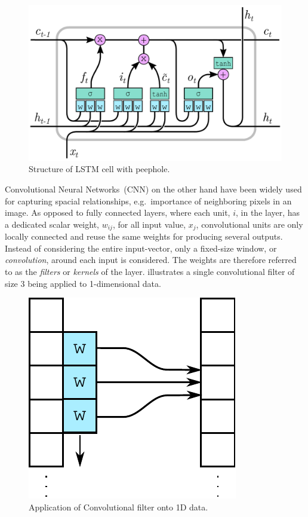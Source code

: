 \documentclass[preprint,11pt,5p,twocolumn]{elsarticle}
\begin{document}
\begin{figure}[!ht]
  \centering
  \includegraphics[scale=.45]{drawings/lstm-peepholes.pdf}
  \caption{Structure of LSTM cell with peephole.}
  \label{fig:lstm-peepholes}
\end{figure}

Convolutional Neural Networks~(CNN) on the other hand have been widely used for capturing spacial relationships, e.g.\ importance of neighboring pixels in an image. As opposed to fully connected layers, where each unit, $i$, in the layer, has a dedicated scalar weight, $w_{ij}$, for all input value, $x_j$, convolutional units are only locally connected and reuse the same weights for producing several outputs. Instead of considering the entire input-vector, only a fixed-size window, or \emph{convolution}, around each input is considered. The weights are therefore referred to as the \emph{filters} or \emph{kernels} of the layer.  illustrates a single convolutional filter of size $3$ being applied to 1-dimensional data.

\begin{figure}[!ht]
  \centering
  \includegraphics[scale=.45]{drawings/conv.pdf}
  \caption{Application of Convolutional filter onto 1D data.}
  \label{fig:conv}
\end{figure}
\end{document}
